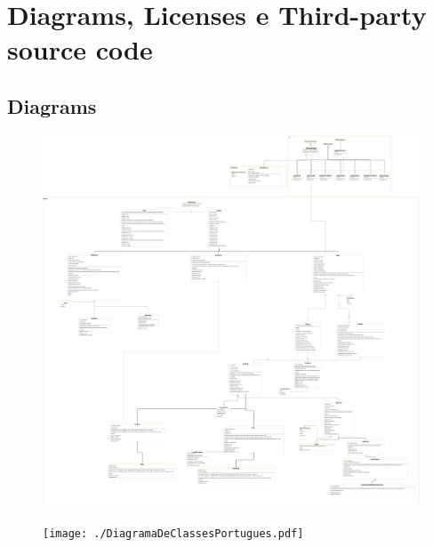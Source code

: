 \documentclass[a4paper,12pt]{article}
\begin{document}
	\section{Diagrams, Licenses e Third-party source code}
		\subsection{Diagrams}
		\begin{figure}[H]
			\centering \includegraphics[width=\textwidth]{./ClassDiagramEnglish.pdf} 
		\end{figure}
		\begin{figure}[H]
			\centering \texttt{[image: ./DiagramaDeClassesPortugues.pdf]}
		\end{figure}
\end{document}
